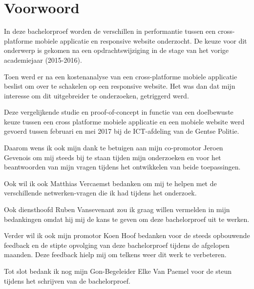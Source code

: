 
\chapter*{Voorwoord}
\label{ch:voorwoord}


In deze bachelorproef worden de verschillen in performantie tussen een cross-platforme mobiele applicatie en responsive website onderzocht.
De keuze voor dit onderwerp is gekomen na een opdrachtswijziging in de stage van het vorige academiejaar (2015-2016).

Toen werd er na een kostenanalyse van een cross-platforme mobiele applicatie beslist om over te schakelen op een responsive website.
Het was dan dat mijn interesse om dit uitgebreider te onderzoeken, getriggerd werd.

Deze vergelijkende studie en proof-of-concept in functie van een doelbewuste keuze tussen een cross platforme mobiele applicatie en
een mobiele website werd gevoerd tussen februari en mei 2017 bij de ICT-afdeling van de Gentse Politie.

Daarom wens ik ook mijn dank te betuigen aan mijn co-promotor Jeroen Gevenois om mij steeds bij te staan tijden mijn onderzoeken en voor
het beantwoorden van mijn vragen tijdens het ontwikkelen van beide toepassingen.

Ook wil ik ook Matthias Vercaemst bedanken om mij te helpen met de verschillende netwerken-vragen die ik had tijdens het onderzoek.

Ook diensthoofd Ruben Vansevenant zou ik graag willen vermelden in mijn bedankingen omdat hij mij de kans te geven om deze bachelorproef uit te werken.

Verder wil ik ook mijn promotor Koen Hoof bedanken voor de steeds opbouwende feedback en de stipte opvolging van deze bachelorproef tijdens de afgelopen maanden.
Deze feedback hielp mij om telkens weer dit werk te verbeteren.

Tot slot bedank ik nog mijn Gon-Begeleider Elke Van Paemel voor de steun tijdens het schrijven van de bachelorproef.
